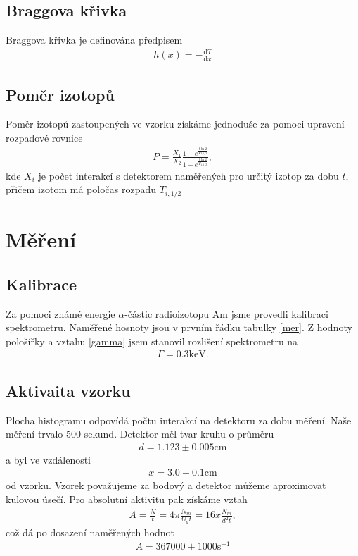 \documentclass[a4paper,12pt]{article}
\renewcommand{\d}{\mbox{d}}
\begin{document}
\subsection{Braggova křivka}
Braggova křivka je definována předpisem
\begin{eqnarray}
h(x)=-\frac{\d T}{\d x}
\label{bragg}
\end{eqnarray}

\subsection{Poměr izotopů}
Poměr izotopů zastoupených ve vzorku získáme jednoduše za pomoci upravení rozpadové rovnice
\begin{eqnarray}
P=\frac{X_1}{X_2}\frac{1-e^{\frac{t\ln 2}{T_{2,1/2}}}}{1-e^{\frac{t\ln 2}{T_{1,1/2}}}},
\label{p}
\end{eqnarray}
kde $X_i$ je počet interakcí s detektorem naměřených pro určitý izotop za dobu $t$, přičem izotom 
má poločas rozpadu $T_{i,1/2}$


\section{Měření}
\subsection{Kalibrace}
Za pomoci známé energie $\alpha$-částic radioizotopu Am jsme provedli kalibraci spektrometru. Naměřené hosnoty jsou v prvním řádku tabulky \ref{mer}. 
Z hodnoty pološířky a vztahu \ref{gamma} jsem stanovil rozlišení spektrometru na
\begin{eqnarray}
\Gamma = 0.3 \mbox{keV}.
\end{eqnarray}

\subsection{Aktivaita vzorku}
Plocha histogramu odpovídá počtu interakcí na detektoru za dobu měření. Naše měření trvalo 500 sekund. Detektor měl tvar kruhu o průměru 
\begin{eqnarray}
d=1.123\pm0.005 \mbox{cm}
\end{eqnarray}
a byl ve vzdálenosti
\begin{eqnarray}
x=3.0\pm0.1 \mbox{cm}
\end{eqnarray}
od vzorku. Vzorek považujeme za bodový a detektor můžeme aproximovat kulovou úsečí. Pro absolutní aktivitu pak získáme vztah
\begin{eqnarray}
A=\frac{N}{t}=4\pi\frac{N_m}{\Omega_dt}=16x\frac{N_m}{d^2t},
\end{eqnarray}
což dá po dosazení naměřených hodnot
\begin{eqnarray}
A=367000\pm1000 \mbox{s}^{-1}
\end{eqnarray}
\end{document}
